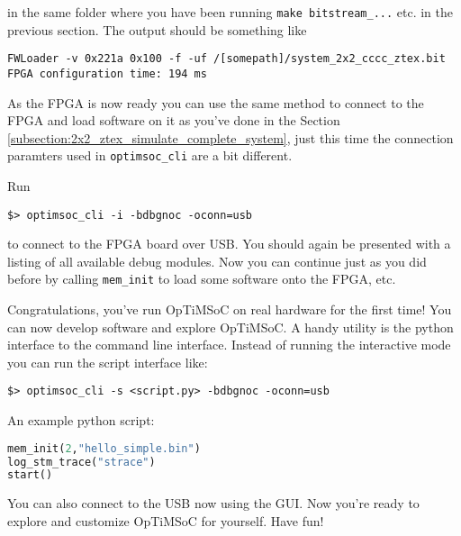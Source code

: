 in the same folder where you have been running \verb|make bitstream_...| etc.
in the previous section. The output should be something like

\begin{lstlisting}
FWLoader -v 0x221a 0x100 -f -uf /[somepath]/system_2x2_cccc_ztex.bit
FPGA configuration time: 194 ms
\end{lstlisting}

As the FPGA is now ready you can use the same method to connect to the
FPGA and load software on it as you've done in the Section
\ref{subsection:2x2_ztex_simulate_complete_system}, just this time the
connection paramters used in \verb|optimsoc_cli| are a bit different.

Run
\begin{lstlisting}
$> optimsoc_cli -i -bdbgnoc -oconn=usb
\end{lstlisting}

to connect to the FPGA board over USB. You should again be presented with a
listing of all available debug modules. Now you can continue just as you did
before by calling \verb|mem_init| to load some software onto the FPGA, etc.

Congratulations, you've run OpTiMSoC on real hardware for the first
time! You can now develop software and explore OpTiMSoC. A handy
utility is the python interface to the command line interface. Instead
of running the interactive mode you can run the script interface like:

\begin{lstlisting}
$> optimsoc_cli -s <script.py> -bdbgnoc -oconn=usb
\end{lstlisting}

An example python script:

\begin{lstlisting}[language=python]
mem_init(2,"hello_simple.bin")
log_stm_trace("strace")
start()
\end{lstlisting}

You can also connect to the USB now using the GUI. Now you're ready to
explore and customize OpTiMSoC for yourself. Have fun!
